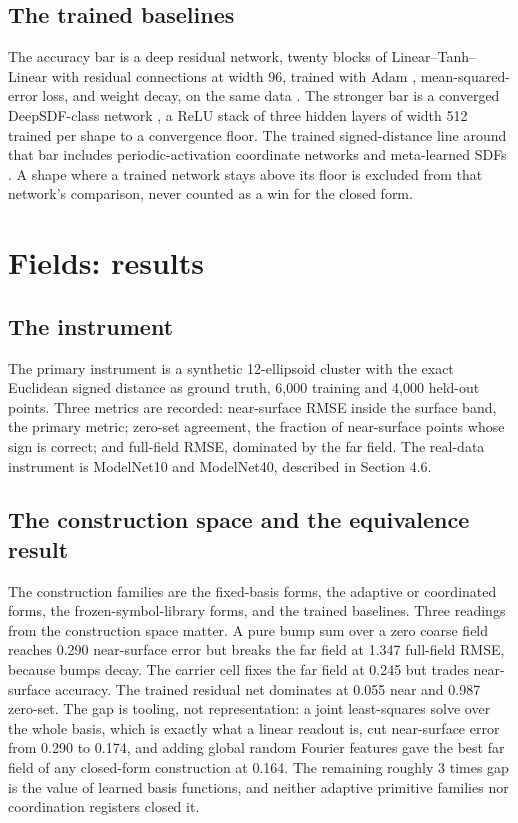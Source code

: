 \documentclass[11pt]{article}
\begin{document}
\subsection{The trained baselines}

The accuracy bar is a deep residual network, twenty blocks of
Linear--Tanh--Linear with residual connections at width 96,
trained with Adam \cite{adam2015}, mean-squared-error loss, and
weight decay, on the same data \cite{he2016}. The stronger bar is a
converged DeepSDF-class network \cite{park2019}, a ReLU stack of
three hidden layers of width 512 trained per shape to a convergence
floor. The trained signed-distance line around that bar includes
periodic-activation coordinate networks \cite{sitzmann2020} and
meta-learned SDFs \cite{sitzmann2019meta}. A shape where a trained
network stays above its floor is
excluded from that network's comparison, never counted as a win for
the closed form.

\section{Fields: results}

\subsection{The instrument}

The primary instrument is a synthetic 12-ellipsoid cluster with the
exact Euclidean signed distance as ground truth, 6{,}000 training
and 4{,}000 held-out points. Three metrics are recorded:
near-surface RMSE inside the surface band, the primary metric;
zero-set agreement, the fraction of near-surface points whose sign
is correct; and full-field RMSE, dominated by the far field. The
real-data instrument is ModelNet10 and ModelNet40, described in
Section 4.6.

\subsection{The construction space and the equivalence result}

The construction families are the fixed-basis forms, the
adaptive or coordinated forms, the frozen-symbol-library forms,
and the trained baselines. Three readings from
the construction space matter. A pure bump sum over a zero coarse
field reaches 0.290 near-surface error but breaks the far field at
1.347 full-field RMSE, because bumps decay. The carrier cell fixes
the far field at 0.245 but trades near-surface accuracy. The
trained residual net dominates at 0.055 near and 0.987 zero-set.
The gap is tooling, not representation: a joint least-squares
solve over the whole basis, which is exactly what a linear readout
is, cut near-surface error from 0.290 to 0.174, and adding global
random Fourier features gave the best far field of any closed-form
construction at 0.164. The remaining roughly 3 times gap is the
value of learned basis functions, and neither adaptive primitive
families nor coordination registers closed it.
\end{document}
